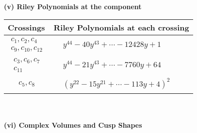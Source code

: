\documentclass[1p]{elsarticle_modified}
\theoremstyle{definition}
\begin{document}
\newpage\renewcommand{\arraystretch}{1}
\flushleft \textbf{(v) Riley Polynomials at the component}\newline \\
\begin{tabular}{m{50pt}|m{274pt}}
Crossings & \hspace{64pt}Riley Polynomials at each crossing \\
\hline $$\begin{aligned}c_{1},c_{2},c_{4}\\c_{9},c_{10},c_{12}\end{aligned}$$&$\begin{aligned}
&y^{44}-40 y^{43}+\cdots-12428 y+1
\end{aligned}$\\
\hline $$\begin{aligned}c_{3},c_{6},c_{7}\\c_{11}\end{aligned}$$&$\begin{aligned}
&y^{44}-21 y^{43}+\cdots-7760 y+64
\end{aligned}$\\
\hline $$\begin{aligned}c_{5},c_{8}\end{aligned}$$&$\begin{aligned}
&(y^{22}-15 y^{21}+\cdots-113 y+4)^{2}
\end{aligned}$\\
\hline
\end{tabular}\\~\\
\newpage\flushleft \textbf{(vi) Complex Volumes and Cusp Shapes}
\end{document}
